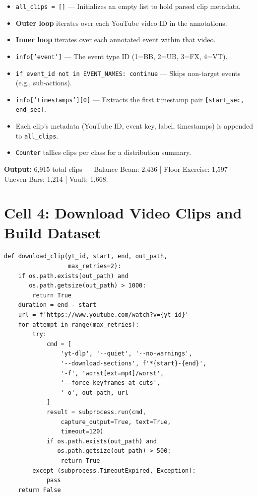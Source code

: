 \begin{explanation}
\begin{itemize}[nosep]
  \item \texttt{all\_clips = []} --- Initializes an empty list to hold parsed clip metadata.
  \item \textbf{Outer loop} iterates over each YouTube video ID in the annotations.
  \item \textbf{Inner loop} iterates over each annotated event within that video.
  \item \texttt{info['event']} --- The event type ID (1=BB, 2=UB, 3=FX, 4=VT).
  \item \texttt{if event\_id not in EVENT\_NAMES: continue} --- Skips non-target events (e.g., sub-actions).
  \item \texttt{info['timestamps'][0]} --- Extracts the first timestamp pair \texttt{[start\_sec, end\_sec]}.
  \item Each clip's metadata (YouTube ID, event key, label, timestamps) is appended to \texttt{all\_clips}.
  \item \texttt{Counter} tallies clips per class for a distribution summary.
\end{itemize}
\textbf{Output:} 6,915 total clips --- Balance Beam: 2,436 | Floor Exercise: 1,597 | Uneven Bars: 1,214 | Vault: 1,668.
\end{explanation}

\newpage
\section{Cell 4: Download Video Clips and Build Dataset}

\begin{lstlisting}
def download_clip(yt_id, start, end, out_path,
                  max_retries=2):
    if os.path.exists(out_path) and
       os.path.getsize(out_path) > 1000:
        return True
    duration = end - start
    url = f'https://www.youtube.com/watch?v={yt_id}'
    for attempt in range(max_retries):
        try:
            cmd = [
                'yt-dlp', '--quiet', '--no-warnings',
                '--download-sections', f'*{start}-{end}',
                '-f', 'worst[ext=mp4]/worst',
                '--force-keyframes-at-cuts',
                '-o', out_path, url
            ]
            result = subprocess.run(cmd,
                capture_output=True, text=True,
                timeout=120)
            if os.path.exists(out_path) and
               os.path.getsize(out_path) > 500:
                return True
        except (subprocess.TimeoutExpired, Exception):
            pass
    return False
\end{lstlisting}

